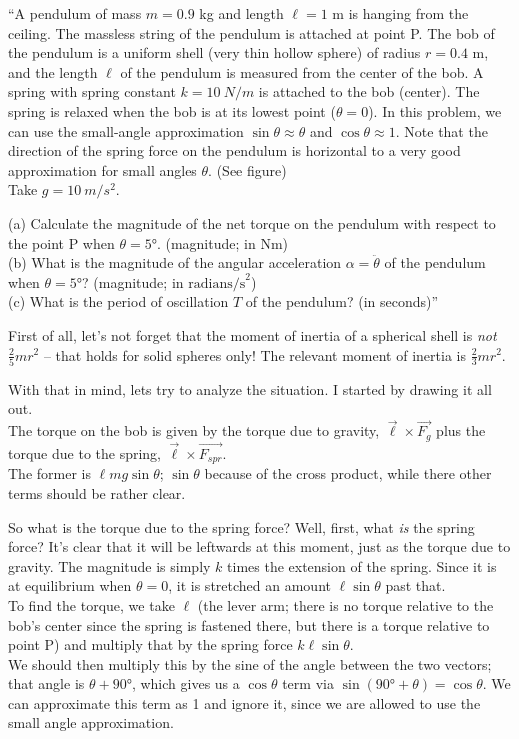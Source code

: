 \documentclass[8.01x]{subfiles}
\begin{document}
``A pendulum of mass $m = 0.9$  kg and length $\ell = 1$ m is hanging from the ceiling. The massless string of the pendulum is attached at point P. The bob of the pendulum is a uniform shell (very thin hollow sphere) of radius $r = 0.4$ m, and the length $\ell$ of the pendulum is measured from the center of the bob. A spring with spring constant $k = \SI{10}{N/m}$ is attached to the bob (center). The spring is relaxed when the bob is at its lowest point ($\theta = 0$). In this problem, we can use the small-angle approximation $\sin \theta \approx \theta$ and $\cos \theta \approx 1$. Note that the direction of the spring force on the pendulum is horizontal to a very good approximation for small angles $\theta$. (See figure)\\
Take $g = \SI{10}{m/s^2}$.

(a) Calculate the magnitude of the net torque on the pendulum with respect to the point P when $\theta = \ang{5}$. (magnitude; in Nm)\\
(b) What is the magnitude of the angular acceleration $\alpha = \ddot{\theta}$ of the pendulum when $\theta = \ang{5}$? (magnitude; in $\text{radians/s}^2$)\\
(c) What is the period of oscillation $T$ of the pendulum? (in seconds)''

First of all, let's not forget that the moment of inertia of a spherical shell is \emph{not} $\frac{2}{5} m r^2$ -- that holds for solid spheres only! The relevant moment of inertia is $\frac{2}{3} m r^2$.

With that in mind, lets try to analyze the situation. I started by drawing it all out.\\
The torque on the bob is given by the torque due to gravity, $\vec{\ell} \times \vec{F_g}$ plus the torque due to the spring, $\vec{\ell} \times \vec{F_{spr}}$.\\
The former is $\ell m g \sin \theta$; $\sin \theta$ because of the cross product, while there other terms should be rather clear.

So what is the torque due to the spring force? Well, first, what \emph{is} the spring force? It's clear that it will be leftwards at this moment, just as the torque due to gravity.
The magnitude is simply $k$ times the extension of the spring. Since it is at equilibrium when $\theta = 0$, it is stretched an amount $\ell \sin \theta$ past that.\\
To find the torque, we take $\ell$ (the lever arm; there is no torque relative to the bob's center since the spring is fastened there, but there is a torque relative to point P) and multiply that by the spring force $k \ell \sin \theta$.\\
We should then multiply this by the sine of the angle between the two vectors; that angle is $\theta + \ang{90}$, which gives us a $\cos \theta$ term via $\sin(\ang{90} + \theta) = \cos \theta$. We can approximate this term as 1 and ignore it, since we are allowed to use the small angle approximation.
\end{document}
